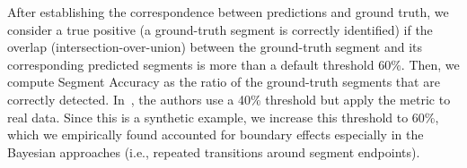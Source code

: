 After establishing the correspondence between predictions and ground truth, we consider a true positive (a ground-truth segment is correctly identified) if the overlap (intersection-over-union) between the ground-truth segment and its corresponding predicted segments is more than a default threshold 60\%.  Then, we compute \textsf{Segment Accuracy} as the ratio of the ground-truth segments that are correctly detected. In~\cite{wu2015watch}, the authors use a 40\% threshold but apply the metric to real data. Since this is a synthetic example, we increase this threshold to 60\%, which we empirically found accounted for boundary effects especially in the Bayesian approaches (i.e., repeated transitions around segment endpoints).



